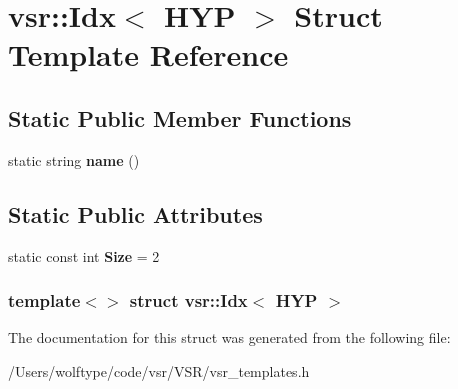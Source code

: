 \hypertarget{structvsr_1_1_idx_3_01_h_y_p_01_4}{\section{vsr\-:\-:Idx$<$ H\-Y\-P $>$ Struct Template Reference}
\label{structvsr_1_1_idx_3_01_h_y_p_01_4}
}
\subsection*{Static Public Member Functions}
\begin{DoxyCompactItemize}
\item 
\hypertarget{structvsr_1_1_idx_3_01_h_y_p_01_4_a167016a6a4ef340a0a25aa4fc8c03e49}{static string {\bfseries name} ()}\label{structvsr_1_1_idx_3_01_h_y_p_01_4_a167016a6a4ef340a0a25aa4fc8c03e49}

\end{DoxyCompactItemize}
\subsection*{Static Public Attributes}
\begin{DoxyCompactItemize}
\item 
\hypertarget{structvsr_1_1_idx_3_01_h_y_p_01_4_af17cdedc63c99f3f0302213e394110b5}{static const int {\bfseries Size} = 2}\label{structvsr_1_1_idx_3_01_h_y_p_01_4_af17cdedc63c99f3f0302213e394110b5}

\end{DoxyCompactItemize}
\subsubsection*{template$<$$>$ struct vsr\-::\-Idx$<$ H\-Y\-P $>$}



The documentation for this struct was generated from the following file\-:\begin{DoxyCompactItemize}
\item 
/\-Users/wolftype/code/vsr/\-V\-S\-R/vsr\-\_\-templates.\-h\end{DoxyCompactItemize}
